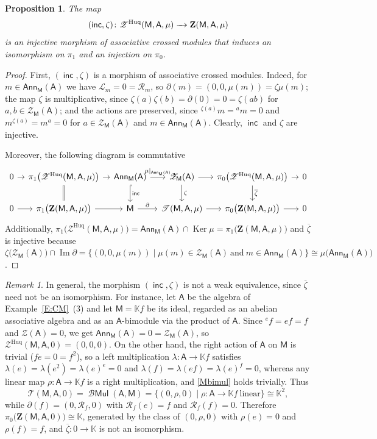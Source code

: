 \documentclass[12pt,reqno]{amsart}
\theoremstyle{plain}
\newtheorem{proposition}[theorem]{Proposition}
\theoremstyle{definition}
\theoremstyle{remark}
\newtheorem{remark}[theorem]{Remark}
\def\lam{\lambda}
\def\Ker{\operatorname{Ker}}
\def\Im{\operatorname{Im}}
\newcommand{\K}{\ensuremath{\mathbb{K}}}
\newcommand{\A}{\ensuremath{\mathsf{A}}}
\newcommand{\MM}{\ensuremath{\mathsf{M}}}
\newcommand{\ZZ}{\ensuremath{\mathscr{Z}}}
\newcommand{\ZC}{\ensuremath{\mathbf{Z}}}
\newcommand{\T}{\ensuremath{\mathcal{T}}}
\newcommand{\Ann}{\ensuremath{\mathsf{Ann}}}
\newcommand{\LL}{\ensuremath{\mathcal{L}}}
\newcommand{\RR}{\ensuremath{\mathcal{R}}}
\DeclareMathOperator{\Mul}{\mathcal{B}\ensuremath{\mathsf{Mul}}}
\DeclareMathOperator{\inc}{\ensuremath{\mathsf{inc}}}
\numberwithin{equation}{section}
\begin{document}
\begin{proposition} The map 
	\[(\inc,\zeta) \colon   \ZZ^{\textnormal{Huq}}(\MM,\A,\mu)  \xrightarrow{ \  \ } \ZC(\MM,\A,\mu)\] is an  injective morphism of associative crossed modules
	 that induces an isomorphism on $\pi_1$  and an injection on  $\pi_0$.
\end{proposition}
\begin{proof}
First, $(\inc,\zeta)$ is a morphism of associative crossed modules. Indeed, for $m\in\Ann_{\MM}(\A)$ we have $\LL_m=0=\RR_m$, so $\partial(m)=(0,0,\mu(m))=\zeta\mu(m)$;
 the map $\zeta$ is multiplicative, since $\zeta(a)\zeta(b)=\partial(0)=0=\zeta(ab)$ for $a,b\in\ZZ_{\MM}(\A)$; and the actions are preserved,
  since ${}^{\zeta(a)}m={}^am=0$ and $m^{\zeta(a)}=m^a=0$ for $a\in\ZZ_{\MM}(\A)$ and $m\in\Ann_{\MM}(\A)$. Clearly, $\inc$ and $\zeta$ are injective.

Moreover, the following diagram is commutative
\[	
\begin{tikzcd}[column sep=0.3cm]
	0 \arrow[r] &  \pi_1 \big(\ZZ^{\text{Huq}}(\MM,\A,\mu) \big) \arrow[d,equal]   \arrow[r] & \Ann_{\MM}(\A) \arrow[d,hook,"\inc"] \arrow[r, "\mu|_{\Ann_{\MM}(\A)}"]  
	& \ZZ_{\MM}(\A)   \arrow[d, "\zeta"]   \arrow[r] &  \pi_0 \big(\ZZ^{\text{Huq}}(\MM,\A,\mu) \big) \arrow[d,  "\overline{\zeta}"]   \arrow[r] & 0   \\
	0 \arrow[r] &  \pi_1 \big(\ZC(\MM,\A,\mu)\big)  \arrow[r]   & \MM  \arrow[r, "\partial"] & \T(\MM,\A,\mu)  \arrow[r]   &  \pi_0 \big(\ZC(\MM,\A,\mu)\big)   \arrow[r] & 0 
\end{tikzcd} 
\]
Additionally, $\pi_1 \big(\ZZ^{\text{Huq}}(\MM,\A,\mu) \big)= \Ann_{\MM}(\A) \cap \Ker \mu=\pi_1 \big(\ZC(\MM,\A,\mu)\big)$  and 
$\overline{\zeta}$ is injective because $\zeta\big(\ZZ_{\MM}(\A)\big) \cap \Im \partial=\{(0,0, \mu(m)) \mid \mu(m) \in  \ZZ_{\MM}(\A) \ \text{and}  \ m \in \Ann_{\MM}(\A)\} \cong \mu\big(\Ann_{\MM}(\A)\big)$.

\end{proof}
\begin{remark}
	In general, the morphism $(\inc,\zeta)$ is not a weak equivalence, since $\overline{\zeta}$ need not be an isomorphism.
For instance, let $\A$ be the algebra of Example~\ref{E:CM}~(3) and let $\MM=\K f$ be its ideal, regarded as an abelian associative algebra and as an $\A$-bimodule via the product of $\A$.
 Since ${}^ef=ef=f$ and $\ZZ(\A)=0$, we get $\Ann_{\MM}(\A)=0=\ZZ_{\MM}(\A)$, so $\ZZ^{\text{Huq}}(\MM,\A,0)=(0,0,0)$. On the other hand,
  the right action of $\A$ on $\MM$ is trivial ($fe=0=f^2$), so a left multiplication $\lam\colon\A\to\K f$ satisfies $\lam(e)=\lam(e^2)=\lam(e)^e=0$
   and $\lam(f)=\lam(ef)=\lam(e)^f=0$, whereas any linear map $\rho\colon\A\to\K f$ is a right multiplication, and \eqref{Mbimul} holds trivially. Thus
	\[
	\T(\MM,\A,0)=\Mul(\A,\MM)=\{(0,\rho,0)\mid \rho\colon \A\to\K f \ \text{linear}\}\cong\K^2,
	\]
	while $\partial(f)=(0,\RR_f,0)$ with $\RR_f(e)=f$ and $\RR_f(f)=0$. Therefore $\pi_0\big(\ZC(\MM,\A,0)\big)\cong\K$, generated by the class of $(0,\rho,0)$
	 with $\rho(e)=0$ and $\rho(f)=f$, and $\overline{\zeta}\colon 0\to\K$ is not an isomorphism.
\end{remark}
\end{document}
